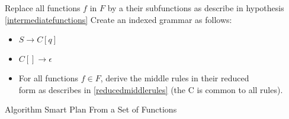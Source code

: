 \documentclass[10pt,a4paper,draft]{article}
\begin{document}
\begin{algorithm}[H]
\SetAlgoLined
{}
Replace all functions $f$ in $F$ by a their subfunctions as describe in hypothesis \ref{intermediatefunctions}\;
Create an indexed grammar as follows:
\begin{itemize}
\item $S \rightarrow C[q]$
\item $C[] \rightarrow \epsilon$
\item For all functions $f \in F$, derive the middle rules in their reduced\\
form as describes in \ref{reducedmiddlerules} (the C is common to all rules).
 \end{itemize}
 \caption{Algorithm Smart Plan From a Set of Functions}
 \label{functionWBLAlgo}
\end{algorithm}
\end{document}
